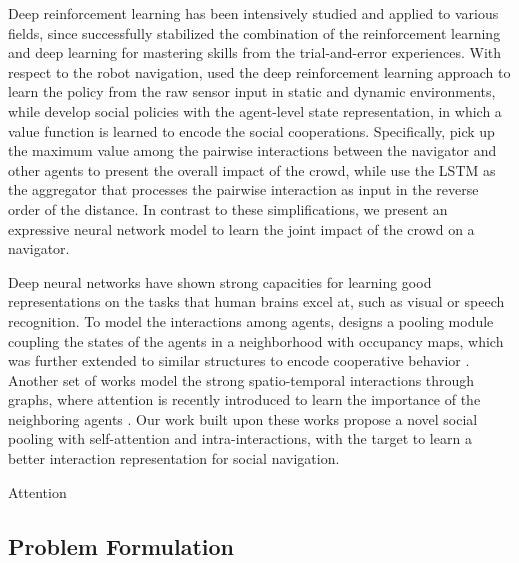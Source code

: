 \documentclass[letterpaper, 10 pt, conference]{ieeeconf}  %
\begin{document}
Deep reinforcement learning has been intensively studied and applied to various fields, since \cite{mnih_human-level_2015} successfully stabilized the combination of the reinforcement learning and deep learning for mastering skills from the trial-and-error experiences. With respect to the robot navigation, \cite{tai_virtual--real_2017,long_towards_2017} used the deep reinforcement learning approach to learn the policy from the raw sensor input in static and dynamic environments, while \cite{chen_decentralized_2016,chen_socially_2017,everett_motion_2018} develop social policies with the agent-level state representation, in which a value function is learned to encode the social cooperations. Specifically, \cite{chen_decentralized_2016} pick up the maximum value among the pairwise interactions between the navigator and other agents to present the overall impact of the crowd, while \cite{everett_motion_2018} use the LSTM as the aggregator that processes the pairwise interaction as input in the reverse order of the distance. In contrast to these simplifications, we present an expressive neural network model to learn the joint impact of the crowd on a navigator. 

Deep neural networks have shown strong capacities for learning good representations on the tasks that human brains excel at, such as visual or speech recognition. To model the interactions among agents, \cite{alahi_social_2016} designs a pooling module coupling the states of the agents in a neighborhood with occupancy maps, which was further extended to similar structures to encode cooperative behavior \cite{fernando_soft_2017, gupta_social_2018}. Another set of works model the strong spatio-temporal interactions through graphs, where attention is recently introduced to learn the importance of the neighboring agents \cite{vemula_social_2017}. Our work built upon these works propose a novel social pooling with self-attention and intra-interactions, with the target to learn a better interaction representation for social navigation. 

Attention \cite{vaswani_attention_2017}
\vspace{2cm}


\subsection{Problem Formulation}
\end{document}
